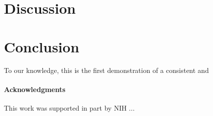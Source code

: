 \documentclass[preprint,authoryear,12pt]{elsarticle}
\begin{document}

\section{Discussion}

\section{Conclusion}
To our knowledge, this is the first demonstration of a consistent and

\paragraph{Acknowledgments}
{This work was supported in part by NIH ... }


 
\end{document}

